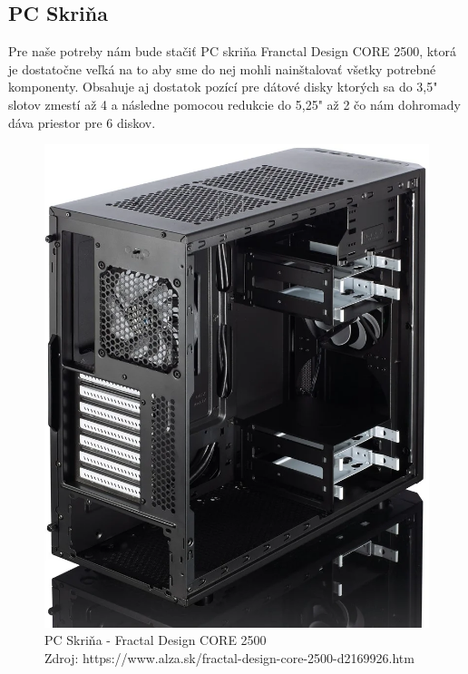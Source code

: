 \documentclass[12pt,oneside,slovak,a4paper]{article}
\begin{document}
\subsection{PC Skriňa}
Pre naše potreby nám bude stačiť PC skriňa Franctal Design CORE 2500, ktorá je dostatočne veľká na to aby sme do nej mohli nainštalovať všetky potrebné komponenty. Obsahuje aj dostatok pozící pre dátové disky ktorých sa do 3,5" slotov zmestí až 4 a následne pomocou redukcie do 5,25" až 2 čo nám dohromady dáva priestor pre 6 diskov.

\begin{figure}[H]
	\centering
	\captionsetup{justification=centering,margin=2cm}
	\includegraphics[width=\linewidth]{./images/case.png} %
	\centering
	\caption{PC Skriňa - Fractal Design CORE 2500 \\ Zdroj: https://www.alza.sk/fractal-design-core-2500-d2169926.htm}
\end{figure}
\end{document}
